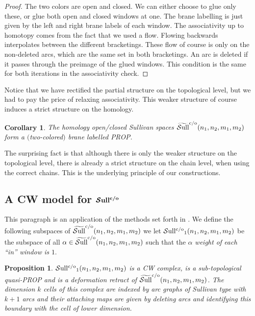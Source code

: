\documentclass[pdftex]{sigma}
\newtheorem{prop}[thm]{Proposition}
\newtheorem{cor}[thm]{Corollary}
\def\Sull{\rm {\mathcal S}ull^{\rm c/o}}
\def\wSull{\widetilde{\rm {\mathcal S}ull}^{\rm c/o}}
\begin{document}
\begin{proof}
The two colors are open and closed. We can either choose to glue only these, or glue both open
and closed windows at one. The brane labelling is just given by the left and right brane labels of
each window. The associativity up to homotopy comes from the fact that we used a f\/low. Flowing
backwards interpolates between the dif\/ferent bracketings. These f\/low of course is only
on the non-deleted arcs, which are the same set in both bracketings. An arc is deleted if it passes
through the preimage of the glued windows. This condition is the same for both iterations
in the associativity check.
\end{proof}


Notice that we have rectif\/ied the partial structure on the topological level, but we had to pay the price
of relaxing associativity.  This weaker structure
of course induces a strict structure on the homology.

\begin{cor}
The homology open/closed Sullivan spaces $\wSull(n_1,n_2,m_1,m_2)$
form a $($two-colored$)$ brane labelled PROP.
\end{cor}



The surprising fact is that although there is only the weaker structure on the topological level,
there is already a strict structure on the chain level, when using the correct chains. This is the underlying principle of our constructions.


\subsection[A CW model for $\Sull$]{A CW model for $\boldsymbol{\Sull}$}

This paragraph is an application of the methods set forth in \cite{hoch1}.
We def\/ine the following subspaces of $\wSull(n_1,n_2,m_1,m_2)$  we let
${\Sull}_1(n_1,n_2,m_1,m_2)$ be the subspace of all $\alpha\in\wSull(n_1,n_2,m_1,m_2)$
such that the {\em $\alpha$ weight of each ``in'' window is $1$}.

\begin{prop}
${\Sull}_1(n_1,n_2,m_1,m_2)$ is a CW complex, is a sub-topological quasi-PROP and is a deformation retract of $\wSull(n_1,n_2,m_1,m_2)$.
The dimension $k$ cells of this complex are indexed by arc graphs of Sullivan type with $k+1$ arcs
and their attaching maps are given by deleting arcs and identifying this boundary with the cell of lower
dimension.
\end{prop}
\end{document}
